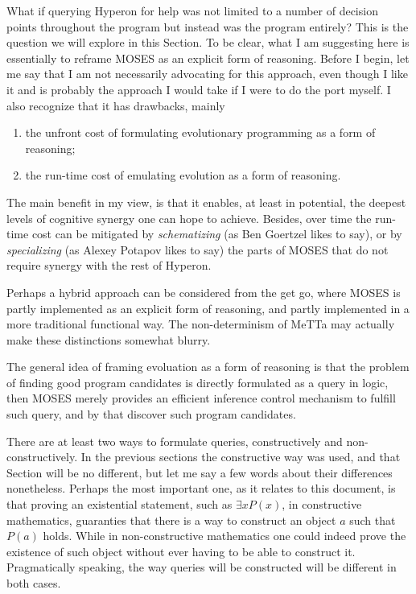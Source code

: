 \documentclass[]{report}
\begin{document}
What if querying Hyperon for help was not limited to a number of
decision points throughout the program but instead was the program
entirely?  This is the question we will explore in this Section.  To
be clear, what I am suggesting here is essentially to reframe MOSES as
an explicit form of reasoning.  Before I begin, let me say that I am
not necessarily advocating for this approach, even though I like it
and is probably the approach I would take if I were to do the port
myself.  I also recognize that it has drawbacks, mainly
\begin{enumerate}
\item the unfront cost of formulating evolutionary programming as a
  form of reasoning;
\item the run-time cost of emulating evolution as a form of reasoning.
\end{enumerate}
The main benefit in my view, is that it enables, at least in
potential, the deepest levels of cognitive synergy one can hope to
achieve.  Besides, over time the run-time cost can be mitigated by
\emph{schematizing} (as Ben Goertzel likes to say), or by
\emph{specializing} (as Alexey Potapov likes to say) the parts of
MOSES that do not require synergy with the rest of Hyperon.

Perhaps a hybrid approach can be considered from the get go, where
MOSES is partly implemented as an explicit form of reasoning, and
partly implemented in a more traditional functional way.  The
non-determinism of MeTTa may actually make these distinctions somewhat
blurry.

The general idea of framing evoluation as a form of reasoning is that
the problem of finding good program candidates is directly formulated
as a query in logic, then MOSES merely provides an efficient inference
control mechanism to fulfill such query, and by that discover such
program candidates.

There are at least two ways to formulate queries, constructively and
non-constructively.  In the previous sections the constructive way was
used, and that Section will be no different, but let me say a few
words about their differences nonetheless.  Perhaps the most important
one, as it relates to this document, is that proving an existential
statement, such as $\exists x P(x)$, in constructive mathematics,
guaranties that there is a way to construct an object $a$ such that
$P(a)$ holds.  While in non-constructive mathematics one could indeed
prove the existence of such object without ever having to be able to
construct it.  Pragmatically speaking, the way queries will be
constructed will be different in both cases.
\end{document}
